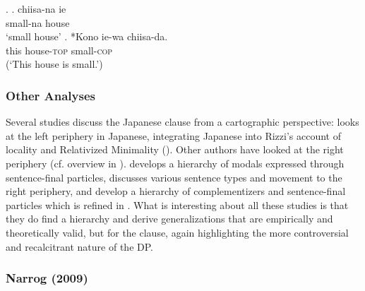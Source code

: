 \ex. \label{rentaishilaenz} \ag. chiisa-na ie\\
small-na house\\
`small house'
\bg. *Kono ie-wa chiisa-da.\\
this house-\textsc{top} small-\textsc{cop}\\
(`This house is small.’)

\subsubsection{Other Analyses}

Several studies discuss the Japanese clause from a cartographic perspective: \citet{endo:2007:locality} looks at the left periphery in Japanese, integrating Japanese into Rizzi's account of locality and Relativized Minimality (\citealt{rizzi:1997:the}). Other authors have looked at the right periphery (cf. overview in \citealt{saito:2015:carto}). \citet{ueda:2008:person} develops a hierarchy of modals expressed through sentence-final particles, \citet{saito:2013:sentence} discusses various sentence types and movement to the right periphery, and \citet{saito:2012:deriving} develop a hierarchy of complementizers and sentence-final particles which is refined in \citet{saito:2015:carto}. What is interesting about all these studies is that they do find a hierarchy and derive generalizations that are empirically and theoretically valid, but for the clause, again highlighting the more controversial and recalcitrant nature of the DP.

\subsubsection{Narrog (2009)} \label{narrog}

